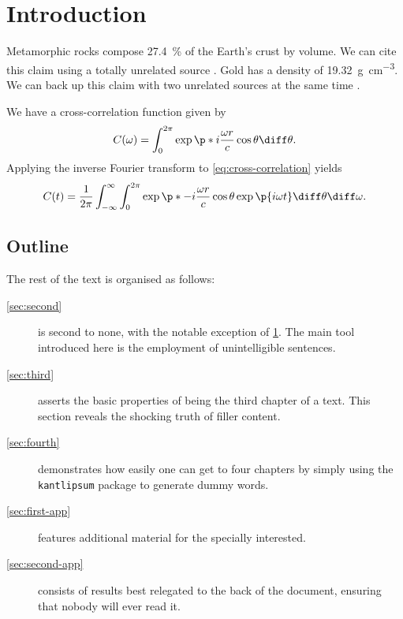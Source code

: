 \chapter{Introduction}
\label{sec:intro}

Metamorphic rocks compose \SI{27,4}{\%} of the Earth's crust by volume.
We can cite this claim using a totally unrelated source \parencite{Cor+14}.
Gold has a density of \SI{19,32}{\gram\per\centi\meter\cubed}.
We can back up this claim with two unrelated sources at the same time \parencite{DeB11, NGU19}.

We have a cross-correlation function given by
\begin{equation}
    \label{eq:cross-correlation}
    C(\omega)
    =
    \int_{0}^{2\pi} \exp \p*{i \frac{\omega r}{c} \cos \theta} \diff \theta.
\end{equation}
Applying the inverse Fourier transform to \eqref{eq:cross-correlation} yields
\begin{equation*}
    C(t)
    =
    \frac{1}{2\pi} \int_{-\infty}^{\infty} \int_{0}^{2\pi}
    \exp \p*{-i \frac{\omega r}{c} \cos \theta}
    \exp \p{i \omega t} \diff \theta \diff \omega.
\end{equation*}

\kant[4-6] %

\section{Outline}

The rest of the text is organised as follows:
\begin{description}
    \item[\cref{sec:second}]
    is second to none, with the notable exception of \cref{sec:intro}.
    The main tool introduced here is the employment of unintelligible sentences.

    \item[\cref{sec:third}]
    asserts the basic properties of being the third chapter of a text.
    This section reveals the shocking truth of filler content.

    \item[\cref{sec:fourth}]
    demonstrates how easily one can get to four chapters by simply using
    the \texttt{kantlipsum} package to generate dummy words.

    \item[\cref{sec:first-app}]
    features additional material for the specially interested.

    \item[\cref{sec:second-app}]
    consists of results best relegated to the back of the document,
    ensuring that nobody will ever read it.
\end{description}